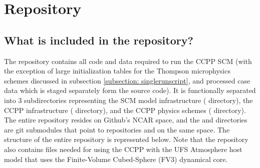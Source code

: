 \chapter{Repository}
\label{chapter: repository}

\section{What is included in the repository?}
The repository contains all code and data required to run the CCPP SCM (with the exception of large initialization tables for the Thompson microphysics schemes discussed in subsection \ref{subsection: singlerunscript}, and processed case data which is staged separately form the source code). It is functionally separated into 3 subdirectories representing the SCM model infrastructure ( directory), the CCPP infrastructure ( directory), and the CCPP physics schemes ( directory). The entire  repository resides on Github's NCAR space, and the  and  directories are git submodules that point to repositories  and  on the same space. The structure of the entire repository is represented below. Note that the  repository also contains files needed for using the CCPP with the UFS Atmosphere host model that uses the Finite-Volume Cubed-Sphere (FV3) dynamical core.

